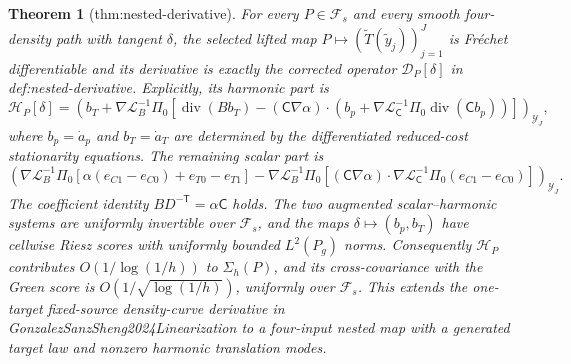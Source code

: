 \documentclass{article}
\newtheorem{theorem}{Theorem}
\begin{document}
\begin{theorem}[thm:nested-derivative]\label{thm:nested-derivative}
For every \(P\in\mathcal F_s\) and every smooth four-density path with tangent \(\delta\), the selected lifted map \(P\mapsto(\widetilde T(\widetilde y_j))_{j=1}^J\) is Fr\'echet differentiable and its derivative is exactly the corrected operator \(\mathcal D_P[\delta]\) in def:nested-derivative.  Explicitly, its harmonic part is
\[
\mathcal H_P[\delta]
=\left(
b_T+\nabla\mathcal L_B^{-1}\Pi_0\!\left[
\operatorname{div}(B b_T)
-(\mathsf C\nabla\alpha)\cdot\left(
b_p+\nabla\mathcal L_{\mathsf C}^{-1}\Pi_0
\operatorname{div}(\mathsf C b_p)
\right)
\right]
\right)_{\mathcal Y_J},
\]
where \(b_p=\dot a_p\) and \(b_T=\dot a_T\) are determined by the differentiated reduced-cost stationarity equations.  The remaining scalar part is
\[
\left(
\nabla\mathcal L_B^{-1}\Pi_0
[\alpha(e_{C1}-e_{C0})+e_{T0}-e_{T1}]
-\nabla\mathcal L_B^{-1}\Pi_0\!\left[
(\mathsf C\nabla\alpha)\cdot
\nabla\mathcal L_{\mathsf C}^{-1}\Pi_0(e_{C1}-e_{C0})
\right]
\right)_{\mathcal Y_J}.
\]
The coefficient identity \(BD^{-\mathsf T}=\alpha\mathsf C\) holds.  The two augmented scalar--harmonic systems are uniformly invertible over \(\mathcal F_s\), and the maps \(\delta\mapsto(b_p,b_T)\) have cellwise Riesz scores with uniformly bounded \(L^2(P_g)\) norms.  Consequently \(\mathcal H_P\) contributes \(O(1/\log(1/h))\) to \(\Sigma_h(P)\), and its cross-covariance with the Green score is \(O(1/\sqrt{\log(1/h)})\), uniformly over \(\mathcal F_s\).  This extends the one-target fixed-source density-curve derivative in GonzalezSanzSheng2024Linearization to a four-input nested map with a generated target law and nonzero harmonic translation modes.
\end{theorem}
\end{document}
